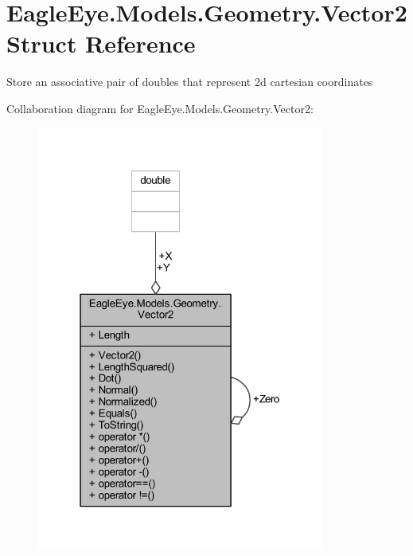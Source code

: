 \hypertarget{struct_eagle_eye_1_1_models_1_1_geometry_1_1_vector2}{}\section{Eagle\+Eye.\+Models.\+Geometry.\+Vector2 Struct Reference}
\label{struct_eagle_eye_1_1_models_1_1_geometry_1_1_vector2}


Store an associative pair of doubles that represent 2d cartesian coordinates  




Collaboration diagram for Eagle\+Eye.\+Models.\+Geometry.\+Vector2\+:\nopagebreak
\begin{figure}[H]
\begin{center}
\leavevmode
\includegraphics[width=268pt]{struct_eagle_eye_1_1_models_1_1_geometry_1_1_vector2__coll__graph}
\end{center}
\end{figure}
